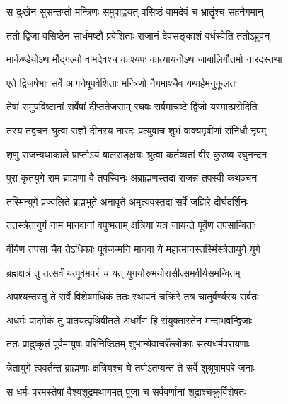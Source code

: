 \twolineshloka
{स दुःखेन सुसन्तप्तो मन्त्रिणः समुपाह्वयत्}
{वसिष्ठं वामदेवं च भ्रातॄंश्च सहनैगमान्} %

\twolineshloka
{ततो द्विजा वसिष्ठेन सार्धमष्टौ प्रवेशिताः}
{राजानं देवसङ्काशं वर्धस्वेति ततोऽब्रुवन्} %

\twolineshloka
{मार्कण्डेयोऽथ मौद्गल्यो वामदेवश्च काश्यपः}
{कात्यायनोऽथ जाबालिर्गौतमो नारदस्तथा} %

\twolineshloka
{एते द्विजर्षभाः सर्वे आगनेषूपवेशिताः}
{मन्त्रिणो नैगमाश्चैव यथार्हमनुकूलतः} %

\twolineshloka
{तेषां समुपविष्टानां सर्वेषां दीप्ततेजसाम्}
{रघवः सर्वमाचष्टे द्विजो यस्मात्प्ररोदिति} %

\twolineshloka
{तस्य तद्वचनं श्रुत्वा राज्ञो दीनस्य नारदः}
{प्रत्युवाच शुभं वाक्यमृषीणां संनिधौ नृपम्} %

\twolineshloka
{शृणु राजन्यथाकाले प्राप्तोऽयं बालसङ्क्षयः}
{श्रुत्वा कर्तव्यतां वीर कुरुष्व रघुनन्दन} %

\twolineshloka
{पुरा कृतयुगे राम ब्राह्मणा वै तपस्विनः}
{अब्राह्मणस्तदा राजन्न तपस्वी कथञ्चन} %

\twolineshloka
{तस्मिन्युगे प्रज्वलिते ब्रह्मभूते अनावृते}
{अमृत्यवस्तदा सर्वे जज्ञिरे दीर्घदर्शिनः} %

\twolineshloka
{ततस्त्रेतायुगं नाम मानवानां वपुष्मताम्}
{क्षत्रिया यत्र जायन्ते पूर्वेण तपसान्विताः} %

\twolineshloka
{वीर्येण तपसा चैव तेऽधिकाः पूर्वजन्मनि}
{मानवा ये महात्मानस्तस्मिंस्त्रेतायुगे युगे} %

\twolineshloka
{ब्रह्मक्षत्रं तु तत्सर्वं यत्पूर्वमपरं च यत्}
{युगयोरुभयोरासीत्समवीर्यसमन्वितम्} %

\twolineshloka
{अपश्यन्तस्तु ते सर्वे विशेषमधिकं ततः}
{स्थापनं चक्रिरे तत्र चातुर्वर्ण्यस्य सर्वतः} %

\twolineshloka
{अधर्मः पादमेकं तु पातयत्पृथिवीतले}
{अधर्मेण हि संयुक्तास्तेन मन्दाभवन्द्विजाः} %

\twolineshloka
{ततः प्रादुष्कृतं पूर्वमायुषः परिनिष्ठितम्}
{शुभान्येवाचरँल्लोकाः सत्यधर्मपरायणाः} %

\twolineshloka
{त्रेतायुगे त्ववर्तन्त ब्राह्मणाः क्षत्रियश्च ये}
{तपोऽतप्यन्त ते सर्वे शुश्रूषामपरे जनाः} %

\twolineshloka
{स धर्मः परमस्तेषां वैश्यशूद्रमथागमत्}
{पूजां च सर्ववर्णानां शूद्राश्चक्रुर्विशेषतः} %

